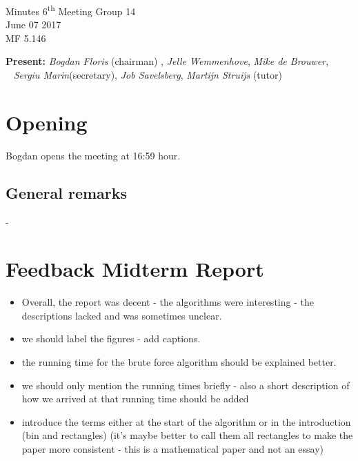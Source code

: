 \documentclass[a4paper,twoside,11pt]{article}
\title{}
\date{}
\newcommand{\ts}{\textsuperscript}
\begin{document}



\begin{center}
	\Huge{Minutes 6\ts{th} Meeting Group 14}
	\\\vspace*{2mm}
	\Large{June 07 2017}
	\\\vspace*{2mm}
	\large{MF 5.146}
	\\
\end{center}

\textbf{Present:}  \textit{Bogdan Floris} (chairman) , \textit{Jelle Wemmenhove}, \textit{Mike de Brouwer},  
\\\indent\qquad\,\,\,\,\,\qquad\quad \textit{Sergiu Marin}(secretary), \textit{Job Savelsberg}, \textit{Martijn Struijs} (tutor)

\linenumbers
\modulolinenumbers[5]

\section{Opening}

Bogdan opens the meeting at 16:59 hour.

\subsection{General remarks}

- 

\section{Feedback Midterm Report}
\begin{itemize}
	\item Overall, the report was decent - the algorithms were interesting - the descriptions lacked and was sometimes unclear.
	\item we should label the figures - add captions.
	\item the running time for the brute force algorithm should be explained better.
	\item we should only mention the running times briefly - also a short description of how we arrived at that running time should be added
	\item introduce the terms either at the start of the algorithm or in the introduction (bin and rectangles) (it's maybe better to call them all rectangles to make the paper more consistent - this is a mathematical paper and not an essay)
\end{itemize}
\end{document}
